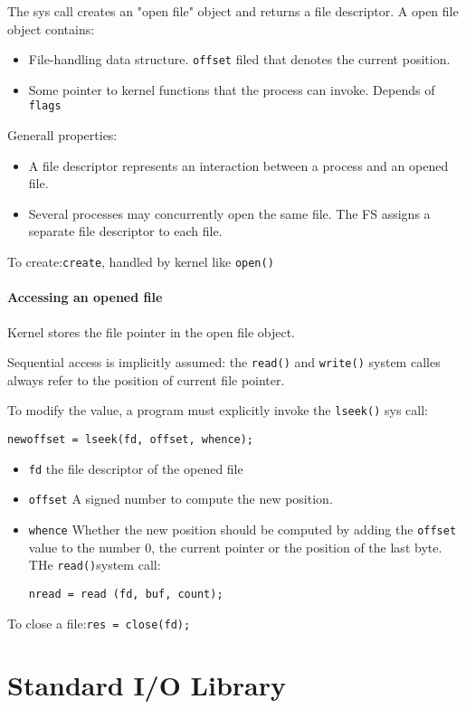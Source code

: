 \documentclass[a4paper,10pt]{book}
\begin{document}
The sys call creates an "open file" object and returns a file descriptor. A open
file object contains:
\begin{itemize}
\item File-handling data structure. \verb|offset| filed that denotes the current
position.
\item Some pointer to kernel functions that the process can invoke. Depends of
\verb|flags|
\end{itemize}
Generall properties:
\begin{itemize}
\item A file descriptor represents an interaction between a process and an
opened file.
\item Several processes may concurrently open the same file. The FS assigns a
separate file descriptor to each file.
\end{itemize}
To create:\verb|create|, handled by kernel like \verb|open()|
\subsubsection{Accessing an opened file}
Kernel stores the file pointer in the open file object.

Sequential access is implicitly assumed: the \verb|read()| and \verb|write()|
system calles always refer to the position of current file pointer.

To modify the value, a program must explicitly invoke the \verb|lseek()| sys
call:
\begin{verbatim}
newoffset = lseek(fd, offset, whence);
\end{verbatim}
\begin{itemize}
\item \verb|fd| the file descriptor of the opened file
\item \verb|offset| A signed number to compute the new position.
\item \verb|whence| Whether the new position should be computed by adding the
\verb|offset| value to the number 0, the current pointer or the position of the
last byte.
THe \verb|read()|system call:
\begin{verbatim}
nread = read (fd, buf, count);
\end{verbatim}
\end{itemize}

To close a file:\verb|res = close(fd);|

\chapter{Standard I/O Library}
\end{document}
